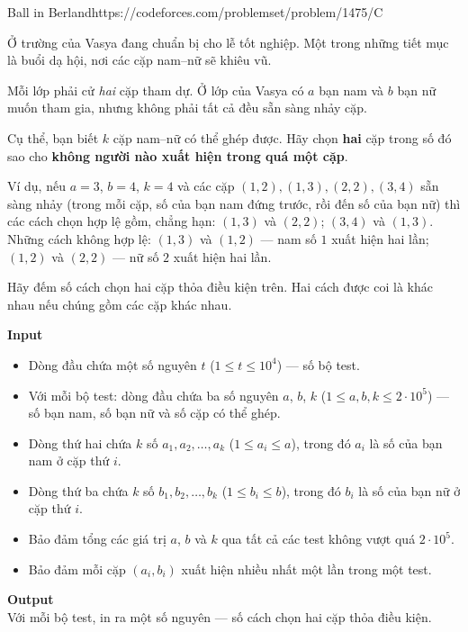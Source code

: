 \begin{baitap}{Ball in Berland}{https://codeforces.com/problemset/problem/1475/C}


Ở trường của Vasya đang chuẩn bị cho lễ tốt nghiệp. Một trong những tiết mục là buổi dạ hội, nơi các cặp nam–nữ sẽ khiêu vũ.

Mỗi lớp phải cử \textit{hai} cặp tham dự. Ở lớp của Vasya có $a$ bạn nam và $b$ bạn nữ muốn tham gia, nhưng không phải tất cả đều sẵn sàng nhảy cặp.

Cụ thể, bạn biết $k$ cặp nam–nữ có thể ghép được. Hãy chọn \textbf{hai} cặp trong số đó sao cho \textbf{không người nào xuất hiện trong quá một cặp}.

Ví dụ, nếu $a=3$, $b=4$, $k=4$ và các cặp $ (1,2), (1,3), (2,2), (3,4) $ sẵn sàng nhảy (trong mỗi cặp, số của bạn nam đứng trước, rồi đến số của bạn nữ) thì các cách chọn hợp lệ gồm, chẳng hạn: $(1,3)$ và $(2,2)$; $(3,4)$ và $(1,3)$. Những cách không hợp lệ: $(1,3)$ và $(1,2)$ — nam số $1$ xuất hiện hai lần; $(1,2)$ và $(2,2)$ — nữ số $2$ xuất hiện hai lần.

Hãy đếm số cách chọn hai cặp thỏa điều kiện trên. Hai cách được coi là khác nhau nếu chúng gồm các cặp khác nhau.

\textbf{Input}
\begin{itemize}[noitemsep]
    \item Dòng đầu chứa một số nguyên $t$ ($1 \le t \le 10^4$) — số bộ test. 
    \item Với mỗi bộ test: dòng đầu chứa ba số nguyên $a$, $b$, $k$ ($1 \le a,b,k \le 2\cdot 10^5$) — số bạn nam, số bạn nữ và số cặp có thể ghép.
    \item Dòng thứ hai chứa $k$ số $a_1,a_2,\ldots,a_k$ ($1 \le a_i \le a$), trong đó $a_i$ là số của bạn nam ở cặp thứ $i$.
    \item Dòng thứ ba chứa $k$ số $b_1,b_2,\ldots,b_k$ ($1 \le b_i \le b$), trong đó $b_i$ là số của bạn nữ ở cặp thứ $i$.
    \item Bảo đảm tổng các giá trị $a$, $b$ và $k$ qua tất cả các test không vượt quá $2\cdot 10^5$.
    \item Bảo đảm mỗi cặp $(a_i,b_i)$ xuất hiện nhiều nhất một lần trong một test.
\end{itemize}

\textbf{Output} \\
Với mỗi bộ test, in ra một số nguyên — số cách chọn hai cặp thỏa điều kiện.



\end{baitap}

